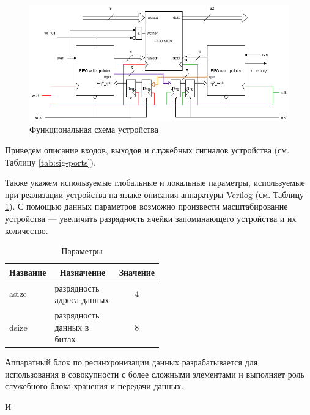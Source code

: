 \begin{figure}[h!]
	\centering
	\includegraphics[width=1\linewidth]{course-scheme/images/unit-design}
	\caption{Функциональная схема устройства}
	\label{fig:unit-design}
\end{figure}


Приведем описание входов, выходов и служебных сигналов устройства (см. Таблицу \ref{tab:sig-ports}).

Также укажем используемые глобальные и локальные параметры, используемые при реализации устройства на языке описания аппаратуры Verilog (см. Таблицу \ref{tab:params}). С помощью данных параметров возможно произвести масштабирование устройства --- увеличить разрядность ячейки запоминающего устройства и их количество.

\begin{table}[htbp]
	\centering
	\fontsize{12}{16pt}\selectfont
	\caption{Параметры}
	\begin{tabular}{|l|p{0.5\linewidth}|c|}
		\hline
		\multicolumn{1}{|c}{\textbf{Название}} & \multicolumn{1}{|c|}{\textbf{Назначение}} & \multicolumn{1}{c|}{\textbf{Значение}} \\ \hline
		asize  &  разрядность адреса данных & 4 \\ \hline
		dsize  &  разрядность данных в битах & 8 \\ \hline
	\end{tabular}
	\label{tab:params}
\end{table}

Аппаратный блок по ресинхронизации данных разрабатывается для использования в совокупности с более сложными элементами и выполняет роль служебного блока хранения и передачи данных.

И



